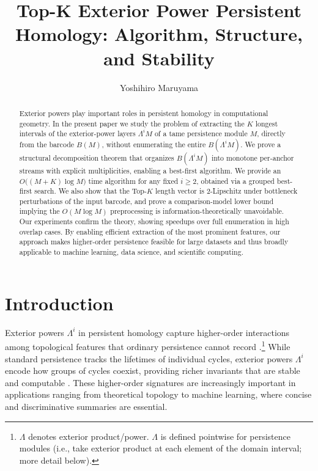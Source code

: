 \documentclass[runningheads]{llncs}
\newcommand{\B}{B}
\newcommand{\Lam}{\Lambda}
\begin{document}
\title{Top-K Exterior Power Persistent Homology: Algorithm, Structure, and Stability}
\author{Yoshihiro Maruyama}

\maketitle

\begin{abstract}
Exterior powers play important roles in persistent homology in computational geometry. 
In the present paper we study the problem of extracting the $K$ longest intervals of the exterior-power layers $\Lam^i M$ of a tame persistence module $M$, directly from the barcode $\B(M)$, without enumerating the entire $\B(\Lam^i M)$. 
We prove a structural decomposition theorem that organizes $\B(\Lam^i M)$ into monotone per-anchor streams with explicit multiplicities, enabling a best-first algorithm.
We provide an $O\bigl((M+K)\log M\bigr)$ time algorithm for any fixed $i \ge 2$, obtained via a grouped best-first search. 
We also show that the Top-$K$ length vector is $2$-Lipschitz under bottleneck
perturbations of the input barcode, and prove a comparison-model
lower bound implying the $O(M\log M)$ preprocessing is information-theoretically unavoidable. 
Our experiments confirm the theory, showing speedups over full enumeration in high overlap cases.
By enabling efficient extraction of the most prominent features, our approach makes higher-order persistence feasible for large datasets and thus broadly applicable to machine learning, data science, and scientific computing.

\end{abstract}

\section{Introduction}

Exterior powers $\Lam^i$ in persistent homology capture higher-order interactions among topological features that ordinary persistence cannot record \cite{Ghrist08,EdelsbrunnerHarer10,Oudot15}.\footnote{$\Lam$ denotes exterior product/power. $\Lam$ is defined pointwise for persistence modules (i.e., take exterior product at each element of the domain interval; more detail below).} While standard persistence tracks the lifetimes of individual cycles, exterior powers $\Lam^i$ encode how groups of cycles coexist, providing richer invariants that are stable and computable \cite{CohenSteiner07,ChazalOudot14,ChazalStructure16}. These higher-order signatures are increasingly important in applications ranging from theoretical topology to machine learning, where concise and discriminative summaries are essential.
\end{document}
